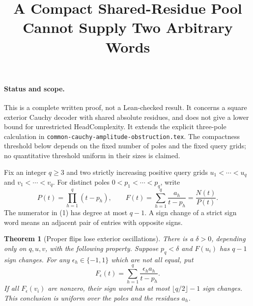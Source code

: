 \documentclass[11pt]{article}
\title{A Compact Shared-Residue Pool Cannot Supply Two Arbitrary Words}
\author{}
\date{}
\newtheorem{theorem}{Theorem}
\begin{document}
\maketitle

\paragraph{Status and scope.}
This is a complete written proof, not a Lean-checked result. It concerns
a square exterior Cauchy decoder with shared absolute residues, and
does not give a lower bound for unrestricted HeadComplexity. It extends
the explicit three-pole calculation in
\texttt{common-cauchy-amplitude-obstruction.tex}. The compactness
threshold below depends on the fixed number of poles and the fixed
query grids; no quantitative threshold uniform in their sizes is
claimed.

Fix an integer $q\geq3$ and two strictly increasing positive query
grids $u_1<\cdots<u_q$ and $v_1<\cdots<v_q$. For distinct poles
$0<p_1<\cdots<p_q$, write
\[
 P(t)=\prod_{h=1}^q(t-p_h),\qquad
 F(t)=\sum_{h=1}^q\frac{a_h}{t-p_h}=\frac{N(t)}{P(t)}.
 \tag{1}
\]
The numerator in (1) has degree at most $q-1$. A sign change of a
strict sign word means an adjacent pair of entries with opposite
signs.

\begin{theorem}[Proper flips lose exterior oscillations]
There is a $\delta>0$, depending only on $q,u,v$, with the following
property. Suppose $p_q<\delta$ and $F(u_i)$ has $q-1$ sign changes.
For any $\epsilon_h\in\{-1,1\}$ which are not all equal, put
\[
 F_\epsilon(t)=\sum_{h=1}^q\frac{\epsilon_h a_h}{t-p_h}.
 \tag{2}
\]
If all $F_\epsilon(v_i)$ are nonzero, their sign word has at most
$\lfloor q/2\rfloor-1$ sign changes. This conclusion is uniform
over the poles and the residues $a_h$.
\end{theorem}
\end{document}
